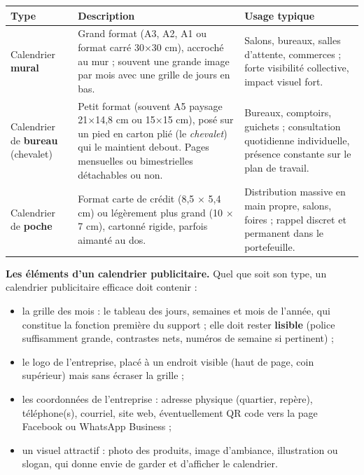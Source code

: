 \documentclass[11pt]{article}
\newcommand{\cle}[1]{{\popxbold\color{popdark}#1}}
\begin{document}
\begin{center}
\begin{tabularx}{\linewidth}{|l|X|X|}
\hline
\rowcolor{popblueL} \textbf{Type} & \textbf{Description} & \textbf{Usage typique} \\
\hline
Calendrier \textbf{mural} & Grand format (A3, A2, A1 ou format carré 30$\times$30 cm), accroché au mur ; souvent une grande image par mois avec une grille de jours en bas. & Salons, bureaux, salles d'attente, commerces ; forte visibilité collective, impact visuel fort. \\
\hline
Calendrier de \textbf{bureau} (chevalet) & Petit format (souvent A5 paysage 21$\times$14,8 cm ou 15$\times$15 cm), posé sur un pied en carton plié (le \emph{chevalet}) qui le maintient debout. Pages mensuelles ou bimestrielles détachables ou non. & Bureaux, comptoirs, guichets ; consultation quotidienne individuelle, présence constante sur le plan de travail. \\
\hline
Calendrier de \textbf{poche} & Format carte de crédit (8,5 $\times$ 5,4 cm) ou légèrement plus grand (10 $\times$ 7 cm), cartonné rigide, parfois aimanté au dos. & Distribution massive en main propre, salons, foires ; rappel discret et permanent dans le portefeuille. \\
\hline
\end{tabularx}
\end{center}

\textbf{Les éléments d'un calendrier publicitaire.} Quel que soit son type, un calendrier publicitaire efficace doit contenir :

\begin{itemize}
\item la \cle{grille des mois} : le tableau des jours, semaines et mois de l'année, qui constitue la fonction première du support ; elle doit rester \textbf{lisible} (police suffisamment grande, contrastes nets, numéros de semaine si pertinent) ;
\item le \cle{logo} de l'entreprise, placé à un endroit visible (haut de page, coin supérieur) mais sans écraser la grille ;
\item les \cle{coordonnées} de l'entreprise : adresse physique (quartier, repère), téléphone(s), courriel, site web, éventuellement QR code vers la page Facebook ou WhatsApp Business ;
\item un \cle{visuel attractif} : photo des produits, image d'ambiance, illustration ou slogan, qui donne envie de garder et d'afficher le calendrier.
\end{itemize}
\end{document}
